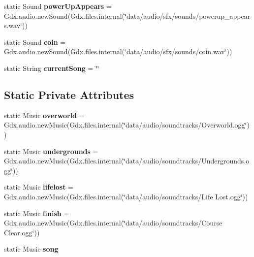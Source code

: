 \begin{DoxyCompactItemize}
\mbox{\label{classnl_1_1arjanfrans_1_1mario_1_1audio_1_1Audio_a862fdb3e8e6904c3f2bc62692bffa95b}} 
static Sound {\bfseries power\+Up\+Appears} = Gdx.\+audio.\+new\+Sound(Gdx.\+files.\+internal(\char`\"{}data/audio/sfx/sounds/powerup\+\_\+appears.\+wav\char`\"{}))
\item 
\mbox{\label{classnl_1_1arjanfrans_1_1mario_1_1audio_1_1Audio_a25432d77021bb323bd2230a57b4859ef}} 
static Sound {\bfseries coin} = Gdx.\+audio.\+new\+Sound(Gdx.\+files.\+internal(\char`\"{}data/audio/sfx/sounds/coin.\+wav\char`\"{}))
\item 
\mbox{\label{classnl_1_1arjanfrans_1_1mario_1_1audio_1_1Audio_a898dcecd8d3a7dc83e3674b5f0f7d555}} 
static String {\bfseries current\+Song} = \char`\"{}\char`\"{}
\end{DoxyCompactItemize}
\subsection*{Static Private Attributes}
\begin{DoxyCompactItemize}
\item 
\mbox{\label{classnl_1_1arjanfrans_1_1mario_1_1audio_1_1Audio_a972d82e5a10d253ba0e5193c0bd154c4}} 
static Music {\bfseries overworld} = Gdx.\+audio.\+new\+Music(Gdx.\+files.\+internal(\char`\"{}data/audio/soundtracks/Overworld.\+ogg\char`\"{}))
\item 
\mbox{\label{classnl_1_1arjanfrans_1_1mario_1_1audio_1_1Audio_a6a7589e0741964c5e4bbf9513d999c87}} 
static Music {\bfseries undergrounds} = Gdx.\+audio.\+new\+Music(Gdx.\+files.\+internal(\char`\"{}data/audio/soundtracks/Undergrounds.\+ogg\char`\"{}))
\item 
\mbox{\label{classnl_1_1arjanfrans_1_1mario_1_1audio_1_1Audio_afd25ef719ffb4c864c2042ff664f0c57}} 
static Music {\bfseries lifelost} = Gdx.\+audio.\+new\+Music(Gdx.\+files.\+internal(\char`\"{}data/audio/soundtracks/Life Lost.\+ogg\char`\"{}))
\item 
\mbox{\label{classnl_1_1arjanfrans_1_1mario_1_1audio_1_1Audio_a8fc0b3722de97cc32b3ae3e906df399c}} 
static Music {\bfseries finish} = Gdx.\+audio.\+new\+Music(Gdx.\+files.\+internal(\char`\"{}data/audio/soundtracks/Course Clear.\+ogg\char`\"{}))
\item 
\mbox{\label{classnl_1_1arjanfrans_1_1mario_1_1audio_1_1Audio_a93c280ab77245f3d66d3d8b90fc189c7}} 
static Music {\bfseries song}
\end{DoxyCompactItemize}


